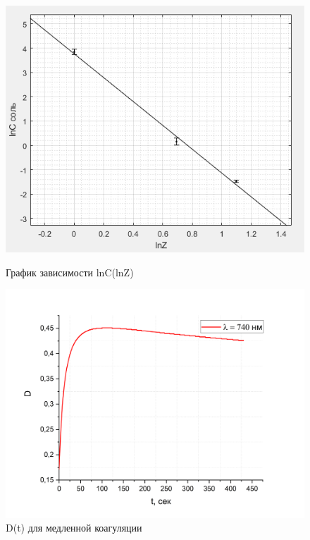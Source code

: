\documentclass[a4paper, 12pt]{article}
\begin{document}
\begin{figure}[h]
\begin{center}
\begin{minipage}[h]{0.45\linewidth}
\includegraphics[width=1\textwidth]{2.1_lnC(lnZ).png}
\caption{График зависимости lnC(lnZ)} %
\label{ris:experimoriginal} %
\end{minipage}
\hfill 
\begin{minipage}[h]{0.5\linewidth}
\includegraphics[width=1\textwidth]{time_coag.png}
\caption{D(t) для медленной коагуляции}
\label{ris:experimcoded}
\end{minipage}
\end{center}
\end{figure}
\end{document}
